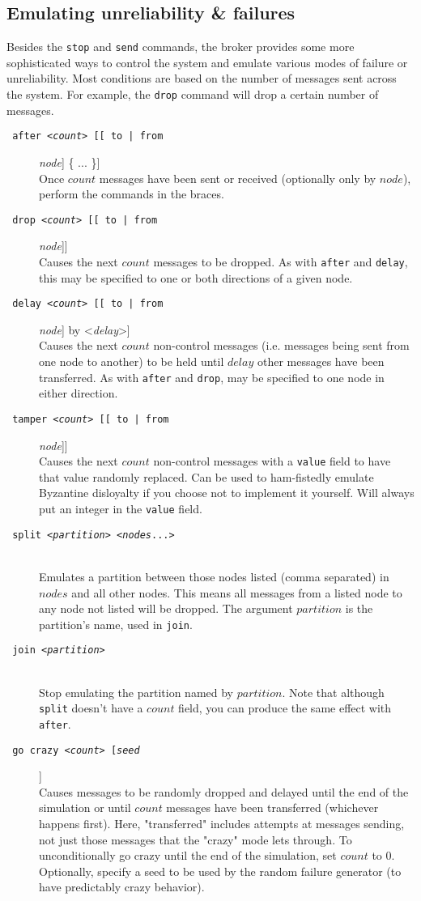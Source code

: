 \documentclass[12pt]{article}
\newcommand{\cmd}[1]{\tt \color{mintgreen} #1}
\newcommand{\cmdDoc}[2]{
\item[\cmd{#1}] \hfill \\ {#2}
}
\begin{document}
\subsection{Emulating unreliability \& failures}
\label{sec:simulation}

Besides the {\tt stop} and {\tt send} commands, the broker provides some more sophisticated ways to control the system and emulate various modes of failure or unreliability. Most conditions are based on the number of messages sent across the system. For example, the {\tt drop} command will drop a certain number of messages.

\begin{description}
\cmdDoc{after <{\em count}> [[ to | from ] {\em node}] \{ ... \}}{
	Once $count$ messages have been sent or received (optionally only by $node$), perform the commands in the braces.
}
\cmdDoc{drop <{\em count}> [[ to | from ] {\em node}]}{
	Causes the next $count$ messages to be dropped. As with {\tt after} and {\tt delay}, this may be specified to one or both directions of a given node.
}
\cmdDoc{delay <{\em count}> [[ to | from ] {\em node}] by <{\em delay}>}{
	Causes the next $count$ non-control messages (i.e. messages being sent from one node to another) to be held until $delay$ other messages have been transferred. As with {\tt after} and {\tt drop}, may be specified to one node in either direction.
}
\cmdDoc{tamper <{\em count}> [[ to | from ] {\em node}]}{
	Causes the next $count$ non-control messages with a {\tt value} field to have that value randomly replaced. Can be used to ham-fistedly emulate Byzantine disloyalty if you choose not to implement it yourself. Will always put an integer in the {\tt value} field.
}
\cmdDoc{split <{\em partition}> <{\em nodes}...>}{
	Emulates a partition between those nodes listed (comma separated) in $nodes$ and all other nodes. This means all messages from a listed node to any node not listed will be dropped. The argument $partition$ is the partition's name, used in {\tt join}.
}
\cmdDoc{join <{\em partition}>}{
	Stop emulating the partition named by $partition$. Note that although {\tt split} doesn't have a $count$ field, you can produce the same effect with {\tt after}.
}
\cmdDoc{go crazy <{\em count}> [{\em seed}]}{
	Causes messages to be randomly dropped and delayed until the end of the simulation or until $count$ messages have been transferred (whichever happens first). Here, "transferred" includes attempts at messages sending, not just those messages that the "crazy" mode lets through. To unconditionally go crazy until the end of the simulation, set $count$ to 0. Optionally, specify a seed to be used by the random failure generator (to have predictably crazy behavior).
}
\end{description}
\end{document}
